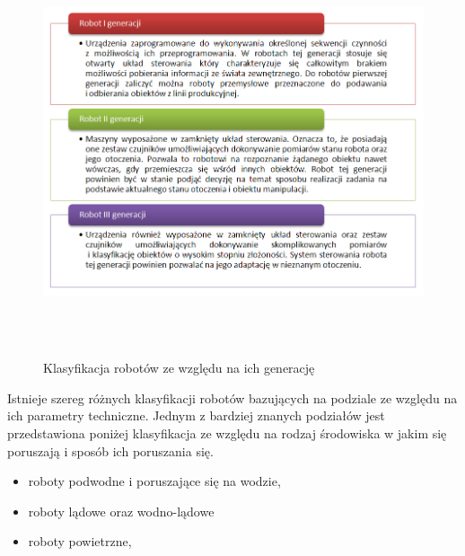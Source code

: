 \begin{figure}[h!]
 \centering
 \includegraphics[height=120mm]{../images/ch01/robot_generations.png}
 \caption{Klasyfikacja robotów ze względu na ich generację}
 \label{fig:RobotsGenerations}
\end{figure}

Istnieje szereg różnych klasyfikacji robotów bazujących na podziale ze względu
na ich parametry techniczne. Jednym z bardziej znanych podziałów jest
przedstawiona poniżej klasyfikacja ze względu na rodzaj środowiska w jakim się
poruszają i sposób ich poruszania się.
\begin{itemize}
  \item roboty podwodne i poruszające się na wodzie,
  \item roboty lądowe oraz wodno-lądowe
  \item roboty powietrzne,
\end{itemize}

